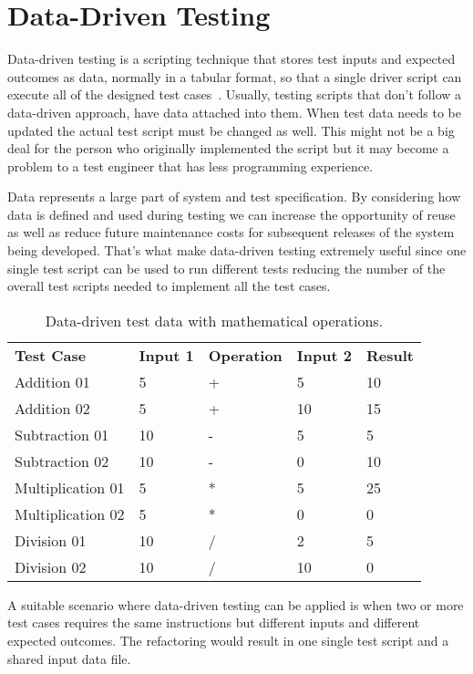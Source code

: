 \section{Data-Driven Testing}

Data-driven testing is a scripting technique that stores test inputs and
expected outcomes as data, normally in a tabular format, so that a single
driver script can execute all of the designed test cases~\cite{Fewster99}.
Usually, testing scripts that don't follow a data-driven approach, have data
attached into them. When test data needs to be updated the actual test script
must be changed as well. This might not be a big deal for the person who
originally implemented the script but it may become a problem to a test engineer
that has less programming experience.

Data represents a large part of system and test specification. By considering
how data is defined and used during testing we can increase the opportunity
of reuse as well as reduce future maintenance costs for subsequent releases of
the system being developed. That's what make data-driven testing extremely
useful since one single test script can be used to run different tests reducing
the number of the overall test scripts needed to implement all the test cases.

\begin{table}[!ht]
\centering
\begin{tabular}{lllll}
\textbf{Test Case} & \textbf{Input 1} & \textbf{Operation} & \textbf{Input 2} & \textbf{Result} \\
Addition 01 & 5 & + & 5 & 10 \\
Addition 02 & 5 & + & 10 & 15 \\
Subtraction 01 & 10 & - & 5 & 5 \\
Subtraction 02 & 10 & - & 0 & 10 \\
Multiplication 01 & 5 & * & 5 & 25 \\
Multiplication 02 & 5 & * & 0 & 0 \\
Division 01 & 10 & / & 2 & 5 \\
Division 02 & 10 & / & 10 & 0 \\
\end{tabular}
\caption{Data-driven test data with mathematical operations.}
\label{table:tab1}
\end{table}

A suitable scenario where data-driven testing can be applied is when two or more
test cases requires the same instructions but different inputs and different
expected outcomes. The refactoring would result in one single test script and a
shared input data file.

